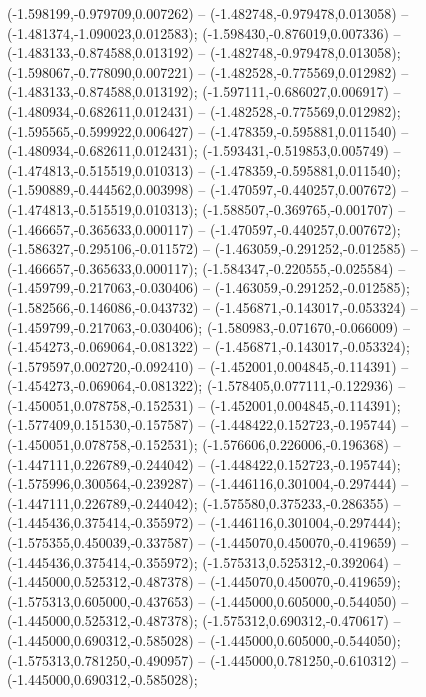  (-1.598199,-0.979709,0.007262) -- (-1.482748,-0.979478,0.013058) -- (-1.481374,-1.090023,0.012583);
 (-1.598430,-0.876019,0.007336) -- (-1.483133,-0.874588,0.013192) -- (-1.482748,-0.979478,0.013058);
 (-1.598067,-0.778090,0.007221) -- (-1.482528,-0.775569,0.012982) -- (-1.483133,-0.874588,0.013192);
 (-1.597111,-0.686027,0.006917) -- (-1.480934,-0.682611,0.012431) -- (-1.482528,-0.775569,0.012982);
 (-1.595565,-0.599922,0.006427) -- (-1.478359,-0.595881,0.011540) -- (-1.480934,-0.682611,0.012431);
 (-1.593431,-0.519853,0.005749) -- (-1.474813,-0.515519,0.010313) -- (-1.478359,-0.595881,0.011540);
 (-1.590889,-0.444562,0.003998) -- (-1.470597,-0.440257,0.007672) -- (-1.474813,-0.515519,0.010313);
 (-1.588507,-0.369765,-0.001707) -- (-1.466657,-0.365633,0.000117) -- (-1.470597,-0.440257,0.007672);
 (-1.586327,-0.295106,-0.011572) -- (-1.463059,-0.291252,-0.012585) -- (-1.466657,-0.365633,0.000117);
 (-1.584347,-0.220555,-0.025584) -- (-1.459799,-0.217063,-0.030406) -- (-1.463059,-0.291252,-0.012585);
 (-1.582566,-0.146086,-0.043732) -- (-1.456871,-0.143017,-0.053324) -- (-1.459799,-0.217063,-0.030406);
 (-1.580983,-0.071670,-0.066009) -- (-1.454273,-0.069064,-0.081322) -- (-1.456871,-0.143017,-0.053324);
 (-1.579597,0.002720,-0.092410) -- (-1.452001,0.004845,-0.114391) -- (-1.454273,-0.069064,-0.081322);
 (-1.578405,0.077111,-0.122936) -- (-1.450051,0.078758,-0.152531) -- (-1.452001,0.004845,-0.114391);
 (-1.577409,0.151530,-0.157587) -- (-1.448422,0.152723,-0.195744) -- (-1.450051,0.078758,-0.152531);
 (-1.576606,0.226006,-0.196368) -- (-1.447111,0.226789,-0.244042) -- (-1.448422,0.152723,-0.195744);
 (-1.575996,0.300564,-0.239287) -- (-1.446116,0.301004,-0.297444) -- (-1.447111,0.226789,-0.244042);
 (-1.575580,0.375233,-0.286355) -- (-1.445436,0.375414,-0.355972) -- (-1.446116,0.301004,-0.297444);
 (-1.575355,0.450039,-0.337587) -- (-1.445070,0.450070,-0.419659) -- (-1.445436,0.375414,-0.355972);
 (-1.575313,0.525312,-0.392064) -- (-1.445000,0.525312,-0.487378) -- (-1.445070,0.450070,-0.419659);
 (-1.575313,0.605000,-0.437653) -- (-1.445000,0.605000,-0.544050) -- (-1.445000,0.525312,-0.487378);
 (-1.575312,0.690312,-0.470617) -- (-1.445000,0.690312,-0.585028) -- (-1.445000,0.605000,-0.544050);
 (-1.575313,0.781250,-0.490957) -- (-1.445000,0.781250,-0.610312) -- (-1.445000,0.690312,-0.585028);
